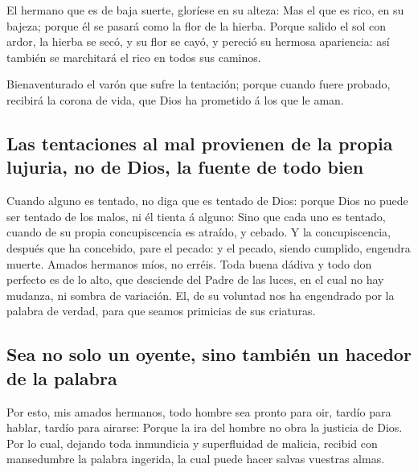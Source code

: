  El hermano que es de baja suerte, gloríese en su alteza:
 Mas el que es rico, en su bajeza; porque él se pasará como
la flor de la hierba.  Porque salido el sol con ardor, la
hierba se secó, y su flor se cayó, y pereció su hermosa apariencia: así
también se marchitará el rico en todos sus caminos.

 Bienaventurado el varón que sufre la tentación; porque
cuando fuere probado, recibirá la corona de vida, que Dios ha prometido
á los que le aman.

\hypertarget{las-tentaciones-al-mal-provienen-de-la-propia-lujuria-no-de-dios-la-fuente-de-todo-bien}{%
\subsection{Las tentaciones al mal provienen de la propia lujuria, no de
Dios, la fuente de todo
bien}\label{las-tentaciones-al-mal-provienen-de-la-propia-lujuria-no-de-dios-la-fuente-de-todo-bien}}

 Cuando alguno es tentado, no diga que es tentado de Dios:
porque Dios no puede ser tentado de los malos, ni él tienta á alguno:
 Sino que cada uno es tentado, cuando de su propia
concupiscencia es atraído, y cebado.  Y la concupiscencia,
después que ha concebido, pare el pecado: y el pecado, siendo cumplido,
engendra muerte.  Amados hermanos míos, no erréis.
 Toda buena dádiva y todo don perfecto es de lo alto, que
desciende del Padre de las luces, en el cual no hay mudanza, ni sombra
de variación.  El, de su voluntad nos ha engendrado por la
palabra de verdad, para que seamos primicias de sus criaturas.

\hypertarget{sea-no-solo-un-oyente-sino-tambiuxe9n-un-hacedor-de-la-palabra}{%
\subsection{Sea no solo un oyente, sino también un hacedor de la
palabra}\label{sea-no-solo-un-oyente-sino-tambiuxe9n-un-hacedor-de-la-palabra}}

 Por esto, mis amados hermanos, todo hombre sea pronto para
oir, tardío para hablar, tardío para airarse:  Porque la
ira del hombre no obra la justicia de Dios.  Por lo cual,
dejando toda inmundicia y superfluidad de malicia, recibid con
mansedumbre la palabra ingerida, la cual puede hacer salvas vuestras
almas.

